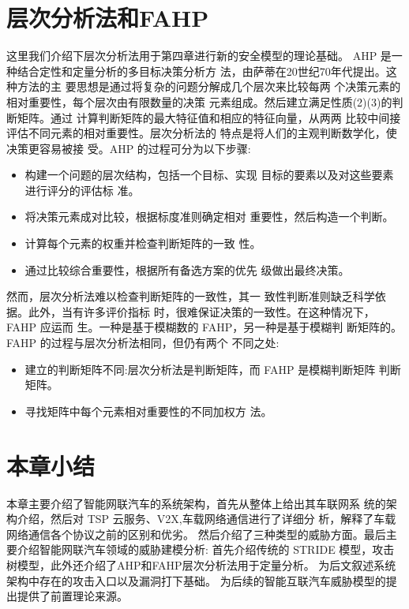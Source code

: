   \section{层次分析法和FAHP}
  这里我们介绍下层次分析法用于第四章进行新的安全模型的理论基础。
  AHP 是一种结合定性和定量分析的多目标决策分析方
法，由萨蒂在20世纪70年代提出\cite{saaty1990make}。这种方法的主
要思想是通过将复杂的问题分解成几个层次来比较每两
个决策元素的相对重要性，每个层次由有限数量的决策
元素组成。然后建立满足性质(2)(3)的判断矩阵。通过
计算判断矩阵的最大特征值和相应的特征向量，从两两
比较中间接评估不同元素的相对重要性。层次分析法的
特点是将人们的主观判断数学化，使决策更容易被接
受。AHP 的过程可分为以下步骤:
\begin{itemize}
  \item  构建一个问题的层次结构，包括一个目标、实现
  目标的要素以及对这些要素进行评分的评估标
  准。
  \item  将决策元素成对比较，根据标度准则确定相对
  重要性，然后构造一个判断。
  \item  计算每个元素的权重并检查判断矩阵的一致
  性。
  \item 通过比较综合重要性，根据所有备选方案的优先
  级做出最终决策。
\end{itemize}

然而，层次分析法难以检查判断矩阵的一致性，其一
致性判断准则缺乏科学依据。此外，当有许多评价指标
时，很难保证决策的一致性。在这种情况下，FAHP 应运而
生\cite{min1997fuzzy}。一种是基于模糊数的 FAHP，另一种是基于模糊判
断矩阵的。FAHP 的过程与层次分析法相同，但仍有两个
不同之处:
\begin{itemize}
  \item  建立的判断矩阵不同:层次分析法是判断矩阵，而
  FAHP 是模糊判断矩阵
  判断矩阵。
  \item  寻找矩阵中每个元素相对重要性的不同加权方
  法。
\end{itemize}


\section{本章小结}

本章主要介绍了智能网联汽车的系统架构，首先从整体上给出其车联网系
统的架构介绍，然后对 TSP 云服务、V2X,车载网络通信进行了详细分
析，解释了车载网络通信各个协议之前的区别和优劣。
然后介绍了三种类型的威胁方面。最后主要介绍智能网联汽车领域的威胁建模分析:
首先介绍传统的 STRIDE 模型，攻击树模型，此外还介绍了AHP和FAHP层次分析法用于定量分析。
为后文叙述系统架构中存在的攻击入口以及漏洞打下基础。
为后续的智能互联汽车威胁模型的提出提供了前置理论来源。